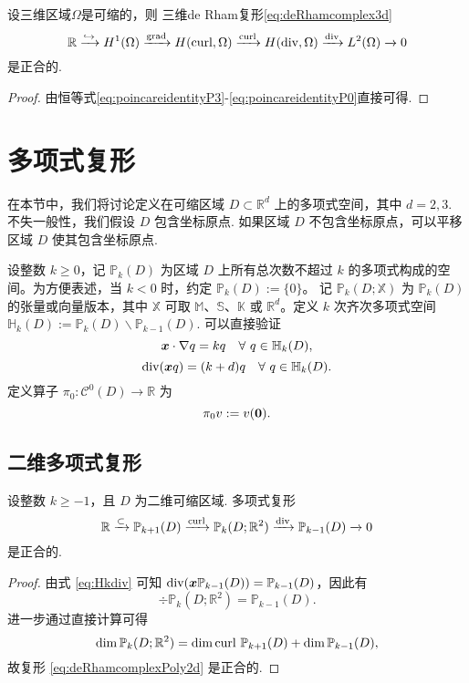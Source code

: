 \begin{theorem}
设三维区域$\Omega$是可缩的，则
三维de Rham复形\eqref{eq:deRhamcomplex3d}
\begin{equation*}
\mathbb R\xrightarrow{\hookrightarrow} H^1(\Omega)\xrightarrow{\operatorname{grad}} H(\operatorname{curl}, \Omega)\xrightarrow{\operatorname{curl}} H(\operatorname{div}, \Omega) \xrightarrow{\operatorname{div}} L^2(\Omega)\xrightarrow{}0
\end{equation*}
是正合的.
\end{theorem}
\begin{proof}
由恒等式\eqref{eq:poincareidentityP3}-\eqref{eq:poincareidentityP0}直接可得.
\end{proof}



\section{多项式复形}

在本节中，我们将讨论定义在可缩区域 $D\subset\mathbb R^d$ 上的多项式空间，其中 $d=2,3$. 不失一般性，我们假设 $D$ 包含坐标原点. 如果区域 $D$ 不包含坐标原点，可以平移区域 $D$ 使其包含坐标原点. 


设整数 $k\geq0$，记 $\mathbb P_k(D)$ 为区域 $D$ 上所有总次数不超过 $k$ 的多项式构成的空间。为方便表述，当 $k<0$ 时，约定 $\mathbb P_k(D):=\{0\}$。
记 $\mathbb P_k(D; \mathbb{X})$ 为 $\mathbb P_k(D)$ 的张量或向量版本，其中 $\mathbb{X}$ 可取 $\mathbb M$、$\mathbb{S}$、$\mathbb{K}$ 或 $\mathbb{R}^d$。定义 $k$ 次齐次多项式空间 $\mathbb H_k(D):=\mathbb P_k(D)\backslash \mathbb P_{k-1}(D)$. 
可以直接验证
\begin{equation}\label{eq:Hkxgrad}
\boldsymbol x\cdot\nabla q=kq\quad\forall~q\in\mathbb H_k(D),
\end{equation}
\begin{equation}\label{eq:Hkdiv}
\operatorname{div}(\boldsymbol x q)=(k+d)q\quad\forall~q\in\mathbb H_k(D).
\end{equation}
定义算子 $\pi_{0}: \mathcal C^0(D)\to \mathbb R$ 为
\[
\pi_{0}v:=v(\boldsymbol0).
\]








\subsection{二维多项式复形}
\begin{lemma}
设整数 $k\geq-1$，且 $D$ 为二维可缩区域.
多项式复形
\begin{equation}\label{eq:deRhamcomplexPoly2d}
\mathbb R\xrightarrow{\subset} \mathbb P_{k+1}(D)\xrightarrow{\operatorname{curl}} \mathbb P_k(D;\mathbb R^2) \xrightarrow{\operatorname{div}} \mathbb P_{k-1}(D)\xrightarrow{}0
\end{equation}
是正合的.  
\end{lemma}
\begin{proof}
由式 \eqref{eq:Hkdiv} 可知
$\operatorname{div}(\boldsymbol x \mathbb P_{k-1}(D)) = \mathbb P_{k-1}(D)$，因此有
\[
\div \mathbb P_k(D;\mathbb R^2) = \mathbb P_{k-1}(D).
\]
进一步通过直接计算可得
\[
\dim\mathbb P_k(D;\mathbb R^2)=\dim \operatorname{curl} \, \mathbb P_{k+1}(D)+\dim \mathbb P_{k-1}(D),
\]
故复形 \eqref{eq:deRhamcomplexPoly2d} 是正合的.
\end{proof}

